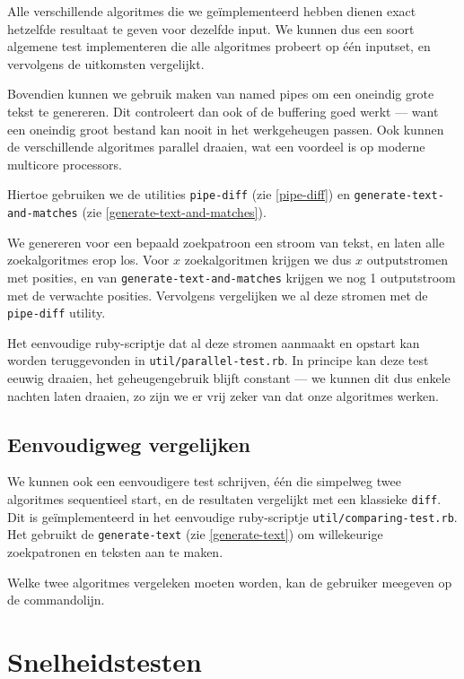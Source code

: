 \documentclass[a4paper,11pt]{article}
\begin{document}
Alle verschillende algoritmes die we ge\"implementeerd hebben dienen exact
hetzelfde resultaat te geven voor dezelfde input. We kunnen dus een soort
algemene test implementeren die alle algoritmes probeert op \'e\'en inputset, en
vervolgens de uitkomsten vergelijkt.

Bovendien kunnen we gebruik maken van named pipes om een oneindig grote tekst
te genereren. Dit controleert dan ook of de buffering goed werkt — want een
oneindig groot bestand kan nooit in het werkgeheugen passen. Ook kunnen de
verschillende algoritmes parallel draaien, wat een voordeel is op moderne
multicore processors.

Hiertoe gebruiken we de utilities \verb#pipe-diff# (zie \ref{pipe-diff}) en
\verb#generate-text-and-matches# (zie \ref{generate-text-and-matches}).

We genereren voor een bepaald zoekpatroon een stroom van tekst, en laten
alle zoekalgoritmes erop los. Voor $x$ zoekalgoritmen krijgen we dus $x$
outputstromen met posities, en van \verb#generate-text-and-matches# krijgen we
nog 1 outputstroom met de verwachte posities. Vervolgens vergelijken we al deze
stromen met de \verb#pipe-diff# utility.

Het eenvoudige ruby-scriptje dat al deze stromen aanmaakt en opstart kan worden
teruggevonden in \verb#util/parallel-test.rb#. In principe kan deze test eeuwig
draaien, het geheugengebruik blijft constant — we kunnen dit dus enkele
nachten laten draaien, zo zijn we er vrij zeker van dat onze algoritmes werken.

\subsection{Eenvoudigweg vergelijken}

We kunnen ook een eenvoudigere test schrijven, \'e\'en die simpelweg twee
algoritmes sequentieel start, en de resultaten vergelijkt met een klassieke
\verb#diff#. Dit is ge\"implementeerd in het eenvoudige ruby-scriptje
\verb#util/comparing-test.rb#. Het gebruikt de \verb#generate-text# (zie
\ref{generate-text}) om willekeurige zoekpatronen en teksten aan te maken.

Welke twee algoritmes vergeleken moeten worden, kan de gebruiker meegeven op de
commandolijn.

\section{Snelheidstesten}
\end{document}
